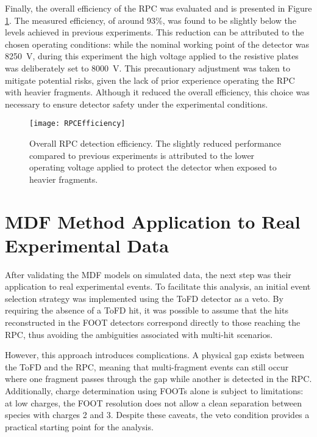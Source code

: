 Finally, the overall efficiency of the \gls{RPC} was evaluated and is presented in Figure \ref{fig:RPCEfficiency}. The measured efficiency, of around 93\%, was found to be slightly below the levels achieved in previous experiments. This reduction can be attributed to the chosen operating conditions: while the nominal working point of the detector was 8250~V, during this experiment the high voltage applied to the resistive plates was deliberately set to 8000~V. This precautionary adjustment was taken to mitigate potential risks, given the lack of prior experience operating the \gls{RPC} with heavier fragments. Although it reduced the overall efficiency, this choice was necessary to ensure detector safety under the experimental conditions.

\begin{figure}
	\centering
	\texttt{[image: RPCEfficiency]}
	\caption[Overall RPC detection efficiency]{Overall \gls{RPC} detection efficiency. The slightly reduced performance compared to previous experiments is attributed to the lower operating voltage applied to protect the detector when exposed to heavier fragments.}
	\label{fig:RPCEfficiency}
\end{figure}



\section{MDF Method Application to Real Experimental Data}

After validating the \gls{MDF} models on simulated data, the next step was their application to real experimental events. To facilitate this analysis, an initial event selection strategy was implemented using the \gls{ToFD} detector as a veto. By requiring the absence of a \gls{ToFD} hit, it was possible to assume that the hits reconstructed in the FOOT detectors correspond directly to those reaching the \gls{RPC}, thus avoiding the ambiguities associated with multi-hit scenarios.

However, this approach introduces complications. A physical gap exists between the \gls{ToFD} and the \gls{RPC}, meaning that multi-fragment events can still occur where one fragment passes through the gap while another is detected in the \gls{RPC}. Additionally, charge determination using FOOTs alone is subject to limitations: at low charges, the FOOT resolution does not allow a clean separation between species with charges 2 and 3. Despite these caveats, the veto condition provides a practical starting point for the analysis.

